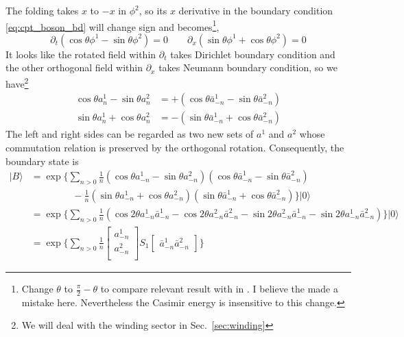 \documentclass{article}
\begin{document}
The folding takes $x$ to $-x$ in $\phi^2$, so its $x$ derivative in the boundary condition \eqref{eq:cpt_boson_bd} will change sign and becomes\footnote{Change $\theta$ to $\frac{\pi}{2} - \theta$ to compare relevant result with in \cite{bachas_permeable_2002}. I believe the \cite{bachas_permeable_2002} made a mistake here. Nevertheless the Casimir energy is insensitive to this change.},
\begin{equation}
\partial_t ( \cos \theta \phi^1  - \sin \theta \phi^2 ) = 0 \qquad \partial_x ( \sin \theta \phi^1  + \cos \theta \phi^2 ) = 0
\end{equation}
It looks like the rotated field within $\partial_t$ takes Dirichlet boundary condition and the other orthogonal field within $\partial_x $ takes Neumann boundary condition, so we have\footnote{We will deal with the winding sector in Sec.~\ref{sec:winding}}
\begin{equation}
\label{eq:rot-D-N}
\begin{aligned}
\cos  \theta a^1_n - \sin \theta a^2_n  &= + \left( \cos  \theta \bar{a}^1_{-n} - \sin \theta \bar{a}^2_{-n} \right)\\
\sin  \theta a^1_n + \cos \theta a^2_n  &= - \left( \sin  \theta \bar{a}^1_{-n} + \cos \theta \bar{a}^2_{-n} \right) 
\end{aligned}
\end{equation}
The left and right sides can be regarded as two new sets of $a^1$ and $a^2$ whose commutation relation is preserved by the orthogonal rotation. Consequently, the boundary state is
\begin{equation}
\label{eq:bd_state}
\begin{aligned}
| B \rangle &= \exp\Big\{ \sum_{n > 0 } \frac{1}{n} (\cos  \theta a^1_{-n} - \sin \theta a ^2_{-n} )(\cos  \theta \bar{a}^1_{-n} - \sin \theta \bar{a}^2_{-n} ) \\
& \,\,  \qquad \qquad -\frac{1}{n} (\sin  \theta a^1_{-n} + \cos \theta a ^2_{-n} )(\sin  \theta \bar{a}^1_{-n} + \cos \theta \bar{a}^2_{-n} )
\Big\} | 0 \rangle \\
& = \exp\Big\{ \sum_{n > 0 } \frac{1}{n} \left( \cos 2\theta a^1_{-n} \bar{a}^1_{-n}  - \cos 2\theta a ^2_{-n} \bar{a}^2_{-n}   
- \sin 2 \theta a ^2_{-n}\bar{a}^1_{-n}  - \sin 2 \theta a ^1_{-n}\bar{a}^2_{-n}  \right ) \Big\}| 0 \rangle \\
& =  \exp\Big\{ \sum_{n > 0 } \frac{1}{n}
\begin{bmatrix}
a_{-n}^1\\
a_{-n}^2\\                              
\end{bmatrix}
S_1
\begin{bmatrix}
\bar{a}_{-n}^1  \bar{a}_{-n}^2
\end{bmatrix} \Big\}
\end{aligned}
\end{equation}
\end{document}
